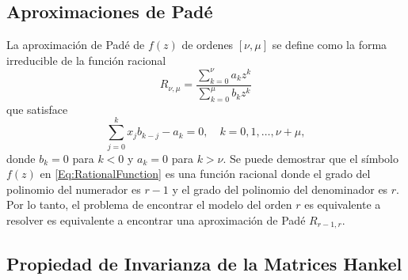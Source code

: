 \subsection{Aproximaciones de Padé}
		La aproximación de Padé de $f(z)$ de ordenes $[\nu,\mu]$ se define como la forma irreducible de la función racional
	\begin{equation}
		R_{\nu,\mu} = \frac{\sum_{k=0}^{\nu}a_kz^k }{\sum_{k=0}^{\mu}b_kz^k}
		\label{Eq:PadeApprox}
	\end{equation} que satisface
	\begin{equation}
		\sum_{j=0}^{k}x_jb_{k-j}-a_k = 0, \quad k = 0,1,\ldots, \nu+\mu,
		\label{Eq:PadeApprox1}
	\end{equation}
	donde $b_k = 0$ para $k<0$ y $a_k = 0$ para $k>\nu$. Se puede demostrar que el símbolo $f(z)$ en \eqref{Eq:RationalFunction} es una función racional donde el grado del polinomio del numerador es $r-1$ y el grado del polinomio del denominador es $r$. Por lo tanto, el problema de encontrar el modelo del orden $r$  es equivalente a resolver es equivalente a encontrar una aproximación de Padé $R_{r-1,r}$.

\subsection{Propiedad de Invarianza de la Matrices Hankel}

